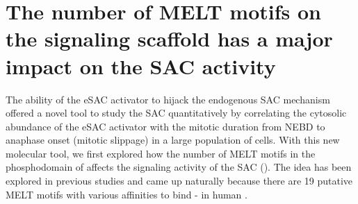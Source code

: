 \section{The number of MELT motifs on the  signaling scaffold has a major impact on the SAC activity}
The ability of the eSAC activator to hijack the endogenous SAC mechanism offered a novel tool to study the SAC quantitatively by correlating the cytosolic abundance of the eSAC activator with the mitotic duration from NEBD to anaphase onset (mitotic slippage) in a large population of cells. With this new molecular tool, we first explored how the number of MELT motifs in the phosphodomain of  affects the signaling activity of the SAC (). The idea has been explored in previous studies and came up naturally because there are 19 putative MELT motifs with various affinities to bind - in human  \cite{RecombinantKNL1, MELTActivity}.

